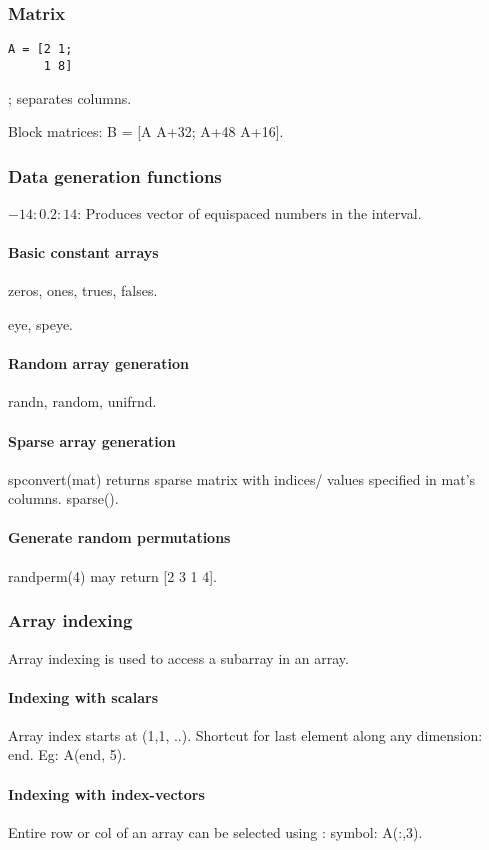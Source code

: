 \subsubsection{Matrix}
\begin{verbatim}
A = [2 1;
     1 8]
\end{verbatim}
; separates columns.

Block matrices: B = [A  A+32; A+48  A+16].

\subsubsection{Data generation functions}
$-14:0.2:14$: Produces vector of equispaced numbers in the interval.

\paragraph*{Basic constant arrays}
zeros, ones, trues, falses.

eye, speye.

\paragraph*{Random array generation}
randn, random, unifrnd.

\paragraph*{Sparse array generation}
spconvert(mat) returns sparse matrix with indices/ values specified in mat's columns. sparse().

\paragraph*{Generate random permutations}
randperm(4) may return [2 3 1 4].

\subsubsection{Array indexing}
Array indexing is used to access a subarray in an array.

\paragraph*{Indexing with scalars}
Array index starts at (1,1, ..). Shortcut for last element along any dimension: end. Eg: A(end, 5).

\paragraph*{Indexing with index-vectors}
Entire row or col of an array can be selected using : symbol: A(:,3).

